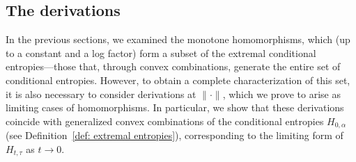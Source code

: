 \documentclass[aps,pra,11pt,onecolumn,nofootinbib,tightenlines]{revtex4-2}
\theoremstyle{definition}
\begin{document}
\subsection{The derivations}
\label{sec: derivations}
In the previous sections, we examined the monotone homomorphisms, which (up to a constant and a log factor) form a subset of the extremal conditional entropies—those that, through convex combinations, generate the entire set of conditional entropies. However, to obtain a complete characterization of this set, it is also necessary to consider derivations at $\|\cdot\|$, which we prove to arise as limiting cases of homomorphisms. In particular, we show that these derivations coincide with generalized convex combinations of the conditional entropies \(H_{0,\alpha}\) (see Definition~\ref{def: extremal entropies}), corresponding to the limiting form of \(H_{t,\tau}\) as \(t \to 0\).
\end{document}
